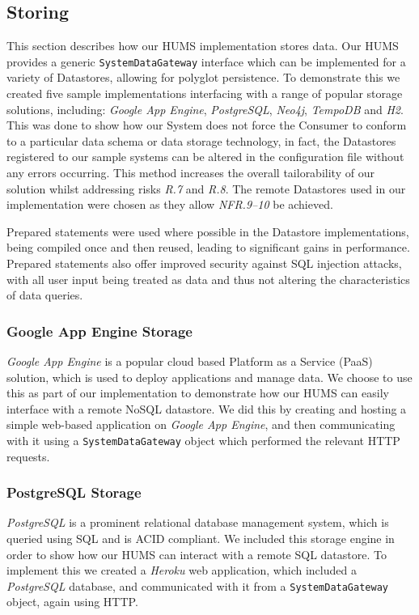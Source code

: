 \documentclass[10pt,a4paper]{article}
\begin{document}
\subsection{Storing}
\label{sec:store}
This section describes how our HUMS implementation stores data. Our HUMS provides a generic \texttt{SystemDataGateway} interface which can be implemented for a variety of Datastores, allowing for polyglot persistence. To demonstrate this we created five sample implementations interfacing with a range of popular storage solutions, including: \emph{Google App Engine}, \emph{PostgreSQL}, \emph{Neo4j}, \emph{TempoDB} and \emph{H2}. This was done to show how our System does not force the Consumer to conform to a particular data schema or data storage technology, in fact, the Datastores registered to our sample systems can be altered in the configuration file without any errors occurring. This method increases the overall tailorability of our solution whilst addressing risks \emph{R.7} and \emph{R.8}. The remote Datastores used in our implementation were chosen as they allow \emph{NFR.9--10} be achieved.

Prepared statements were used where possible in the Datastore implementations, being compiled once and then reused, leading to significant gains in performance. Prepared statements also offer improved security against SQL injection attacks, with all user input being treated as data and thus not altering the characteristics of data queries.

\subsubsection{Google App Engine Storage}
\emph{Google App Engine} is a popular cloud based Platform as a Service (PaaS) solution, which is used to deploy applications and manage data. We choose to use this as part of our implementation to demonstrate how our HUMS can easily interface with a remote NoSQL datastore. We did this by creating and hosting a simple web-based application on \emph{Google App Engine}, and then communicating with it using a \texttt{SystemDataGateway} object which performed the relevant HTTP requests.  

\subsubsection{PostgreSQL Storage}
\emph{PostgreSQL} is a prominent relational database management system, which is queried using SQL and is ACID compliant. We included this storage engine in order to show how our HUMS can interact with a remote SQL datastore. To implement this we created a \emph{Heroku} web application, which included a \emph{PostgreSQL} database, and communicated with it from a \texttt{SystemDataGateway} object, again using HTTP.
\end{document}
